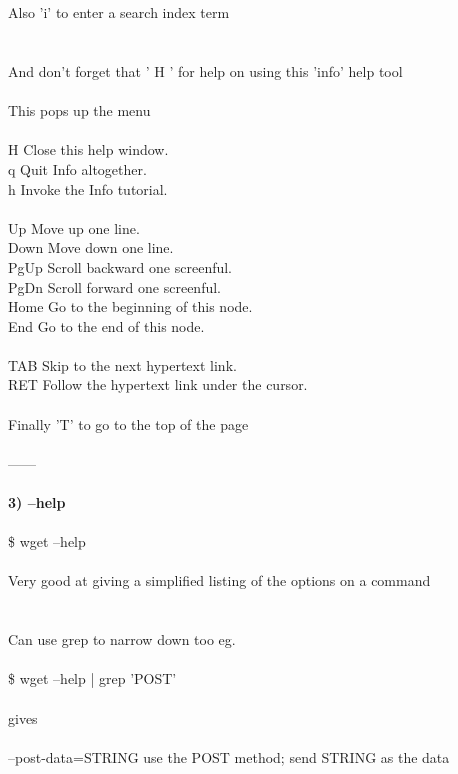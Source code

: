 \documentclass[10pt,a4paper]{article}
\begin{document}
\\
\\
Also 'i' to enter a search index term\\
\\
\\
And don't forget that ' H ' for help on using this 'info' help tool\\
\\
This pops up the menu\\
\\
H           Close this help window.\\
q           Quit Info altogether.\\
h           Invoke the Info tutorial.\\
\\
Up          Move up one line.\\
Down        Move down one line.\\
PgUp        Scroll backward one screenful.\\
PgDn        Scroll forward one screenful.\\
Home        Go to the beginning of this node.\\
End         Go to the end of this node.\\
\\
TAB         Skip to the next hypertext link.\\
RET         Follow the hypertext link under the cursor.\\
\\
Finally 'T' to go to the top of the page\\
\\
------\\
\\
\textbf{{\large 3) --help}}\\
\\
\$ wget --help\\
\\
Very good at giving a simplified listing of the options on a command\\
\\
\\
Can use grep to narrow down too eg.\\
\\
\$ wget --help | grep 'POST'\\
\\
gives\\
\\
--post-data=STRING          use the POST method; send STRING as the data\\
\end{document}
